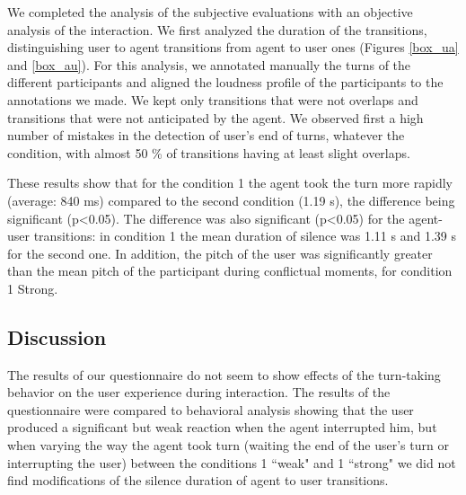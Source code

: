 We completed the analysis of the subjective evaluations with an objective analysis of the interaction. 
We first analyzed the duration of the transitions, distinguishing user to agent transitions from agent to user ones (Figures \ref{box_ua} and \ref{box_au}).
For this analysis, we annotated manually the turns of the different participants and aligned the loudness profile of the participants to the annotations we made. We kept only transitions that were not overlaps and transitions that were not anticipated by the agent. We observed first a high number of mistakes in the detection of user's end of turns, whatever the condition, with almost 50 \% of transitions having at least slight overlaps.  

These results show that for the condition 1 the agent took the turn more rapidly (average: 840 ms) compared to the second condition (1.19 s), the difference being significant (p<0.05). The difference was also significant (p<0.05) for the agent-user transitions: in condition 1 the mean duration of silence was 1.11 s and 1.39 s for the second one. 
In addition, the pitch of the user was significantly greater than the mean pitch of the participant during conflictual moments, for condition 1 Strong.



\subsection{Discussion}

The results of our questionnaire do not seem to show effects of the turn-taking behavior on the user experience during interaction. The results of the questionnaire were compared to behavioral analysis showing that the user produced a significant but weak reaction when the agent interrupted him, but when varying the way the agent took turn (waiting the end of the user's turn or interrupting the user) between the conditions 1 ``weak" and 1 ``strong" we did not find modifications of the silence duration of agent to user transitions. 

